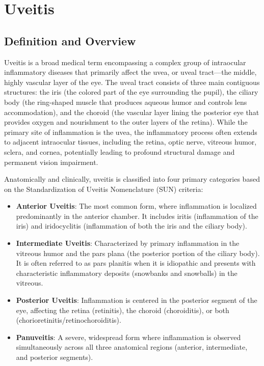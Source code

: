 \chapter{Uveitis}

\section*{Definition and Overview}
Uveitis is a broad medical term encompassing a complex group of intraocular inflammatory diseases that primarily affect the uvea, or uveal tract—the middle, highly vascular layer of the eye. The uveal tract consists of three main contiguous structures: the iris (the colored part of the eye surrounding the pupil), the ciliary body (the ring-shaped muscle that produces aqueous humor and controls lens accommodation), and the choroid (the vascular layer lining the posterior eye that provides oxygen and nourishment to the outer layers of the retina). While the primary site of inflammation is the uvea, the inflammatory process often extends to adjacent intraocular tissues, including the retina, optic nerve, vitreous humor, sclera, and cornea, potentially leading to profound structural damage and permanent vision impairment.

Anatomically and clinically, uveitis is classified into four primary categories based on the Standardization of Uveitis Nomenclature (SUN) criteria:
\begin{itemize}
    \item \textbf{Anterior Uveitis}: The most common form, where inflammation is localized predominantly in the anterior chamber. It includes iritis (inflammation of the iris) and iridocyclitis (inflammation of both the iris and the ciliary body).
    \item \textbf{Intermediate Uveitis}: Characterized by primary inflammation in the vitreous humor and the pars plana (the posterior portion of the ciliary body). It is often referred to as pars planitis when it is idiopathic and presents with characteristic inflammatory deposits (snowbanks and snowballs) in the vitreous.
    \item \textbf{Posterior Uveitis}: Inflammation is centered in the posterior segment of the eye, affecting the retina (retinitis), the choroid (choroiditis), or both (chorioretinitis/retinochoroiditis).
    \item \textbf{Panuveitis}: A severe, widespread form where inflammation is observed simultaneously across all three anatomical regions (anterior, intermediate, and posterior segments).
\end{itemize}

